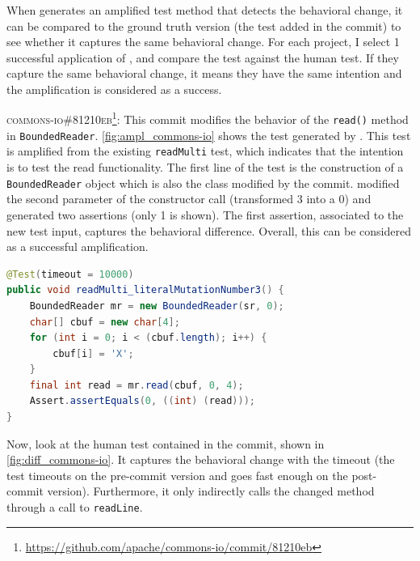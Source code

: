 \subsubsection{\rqhuman}
\label{subsubsec:dci:evaluation:rq4}

When \DCI generates an amplified test method that detects the behavioral change, it can be compared to the ground truth version (the test added in the commit) to see whether it captures the same behavioral change.
For each project, I select 1 successful application of \DCI, and compare the \DCI test against the human test.
If they capture the same behavioral change, it means they have the same intention and the amplification is considered as a success.


\textsc{commons-io\#81210eb}\footnote{\url{https://github.com/apache/commons-io/commit/81210eb}}: This commit modifies the behavior of the \texttt{read()} method in \texttt{BoundedReader}.
\autoref{fig:ampl_commons-io} shows the test generated by \DCII.
This test is amplified from the existing \texttt{readMulti} test, which indicates that the intention is to test the read functionality.
The first line of the test is the construction of a \texttt{BoundedReader} object which is also the class modified by the commit.
\DCII modified the second parameter of the constructor call (transformed $3$ into a $0$) and generated two assertions (only 1 is shown).
The first assertion, associated to the new test input, captures the behavioral difference.
Overall, this can be considered as a successful amplification.

\begin{lstlisting}[language=java,caption=Test generated by \DCII that detects the behavioral change introduced by commit \textsc{81210eb} in commons-io.,label=fig:ampl_commons-io]
@Test(timeout = 10000)
public void readMulti_literalMutationNumber3() {
	BoundedReader mr = new BoundedReader(sr, 0);
	char[] cbuf = new char[4];
	for (int i = 0; i < (cbuf.length); i++) {
		cbuf[i] = 'X';
	}
	final int read = mr.read(cbuf, 0, 4);
	Assert.assertEquals(0, ((int) (read)));
}        
\end{lstlisting}

Now, look at the human test contained in the commit, shown in \autoref{fig:diff_commons-io}.
It captures the behavioral change with the timeout (the test timeouts on the pre-commit version and goes fast enough on the post-commit version). 
Furthermore, it only indirectly calls the changed method through a call to \texttt{readLine}.

